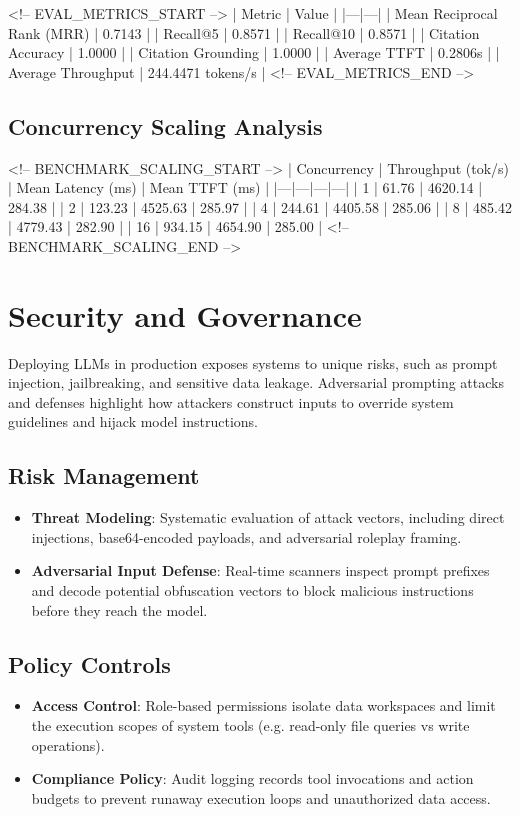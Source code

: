 \documentclass[11pt]{article}
\begin{document}
<!-- EVAL_METRICS_START -->
| Metric | Value |
|---|---|
| Mean Reciprocal Rank (MRR) | 0.7143 |
| Recall@5 | 0.8571 |
| Recall@10 | 0.8571 |
| Citation Accuracy | 1.0000 |
| Citation Grounding | 1.0000 |
| Average TTFT | 0.2806s |
| Average Throughput | 244.4471 tokens/s |
<!-- EVAL_METRICS_END -->

\subsection{Concurrency Scaling Analysis}

<!-- BENCHMARK_SCALING_START -->
| Concurrency | Throughput (tok/s) | Mean Latency (ms) | Mean TTFT (ms) |
|---|---|---|---|
| 1 | 61.76 | 4620.14 | 284.38 |
| 2 | 123.23 | 4525.63 | 285.97 |
| 4 | 244.61 | 4405.58 | 285.06 |
| 8 | 485.42 | 4779.43 | 282.90 |
| 16 | 934.15 | 4654.90 | 285.00 |
<!-- BENCHMARK_SCALING_END -->

\section{Security and Governance}

Deploying LLMs in production exposes systems to unique risks, such as prompt injection, jailbreaking, and sensitive data leakage. Adversarial prompting attacks and defenses \cite{source-adversarial-2024} highlight how attackers construct inputs to override system guidelines and hijack model instructions.

\subsection{Risk Management}

\begin{itemize}
  \item \textbf{Threat Modeling}: Systematic evaluation of attack vectors, including direct injections, base64-encoded payloads, and adversarial roleplay framing.
  \item \textbf{Adversarial Input Defense}: Real-time scanners inspect prompt prefixes and decode potential obfuscation vectors to block malicious instructions before they reach the model.
\end{itemize}

\subsection{Policy Controls}

\begin{itemize}
  \item \textbf{Access Control}: Role-based permissions isolate data workspaces and limit the execution scopes of system tools (e.g. read-only file queries vs write operations).
  \item \textbf{Compliance Policy}: Audit logging records tool invocations and action budgets to prevent runaway execution loops and unauthorized data access.
\end{itemize}
\end{document}

